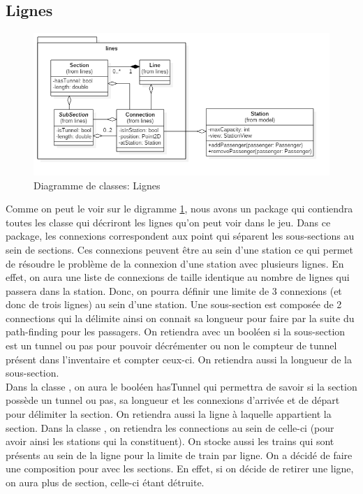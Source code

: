 \documentclass[report, backcover, french, nodocumentinfo]{upmethodology-document}
\begin{document}
			\subsection{Lignes}
				\begin{figure}[h!]
					\centering
					\includegraphics[width=1\textwidth]{figures/LinesClassDiagram}
					\caption{Diagramme de classes: Lignes}
					\label{fig:LinesClassDiagram}
				\end{figure}
					Comme on peut le voir sur le digramme \ref{fig:LinesClassDiagram}, nous avons un package  qui contiendra toutes les classe qui décriront les lignes qu'on peut voir dans le jeu. Dans ce package, les connexions correspondent aux point qui séparent les sous-sections au sein de sections. Ces connexions peuvent être au sein d'une station ce qui permet de résoudre le problème de la connexion d'une station avec plusieurs lignes. En effet, on aura une liste de connexions de taille identique au nombre de lignes qui passera dans la station. Donc, on pourra définir une limite de 3 connexions (et donc de trois lignes) au sein d'une station.
					Une sous-section est composée de 2 connections qui la délimite ainsi on connait sa longueur pour faire par la suite du path-finding pour les passagers. On retiendra avec un booléen si la sous-section est un tunnel ou pas pour pouvoir décrémenter ou non le compteur de tunnel présent dans l'inventaire et compter ceux-ci. On retiendra aussi la longueur de la sous-section.\\
					Dans la classe , on aura le booléen hasTunnel qui permettra de savoir si la section possède un tunnel ou pas, sa longueur et les connexions d'arrivée et de départ pour délimiter la section. On retiendra aussi la ligne à laquelle appartient la section.
					Dans la classe , on retiendra les connections au sein de celle-ci (pour avoir ainsi les stations qui la constituent). On stocke aussi les trains qui sont présents au sein de la ligne pour la limite de train par ligne. On a décidé de faire une composition pour avec les sections. En effet, si on décide de retirer une ligne, on aura plus de section, celle-ci étant détruite.
\end{document}
